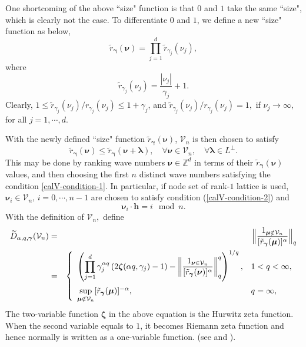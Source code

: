 \documentclass[article]{siamltex}
\def\bh{{\boldsymbol h}}
\def\bmu{{\boldsymbol \mu }}
\def\bnu{{\boldsymbol \nu }}
\def\blam{{\boldsymbol \lambda }}
\def\bgam{{\boldsymbol \gamma }}
\def\bzeta{{\boldsymbol \zeta }}
\def\calV {\mathcal {V}}
\newcommand{\df}[2]{\displaystyle\frac{#1}{#2}}
\newcommand{\crno}{\cr\noalign{\vskip2mm}}
\newcommand{\Z}{{\mathbb Z}}
\newcommand{\dprod}{\displaystyle\prod}
\begin{document}
One shortcoming of  the above ``size" function is that $0$ and $1$ take the same ``size", which is clearly not the case. To differentiate  $0$ and $1$, we define a new ``size" function as below,
\begin{equation}\label{rnew}\tilde{r}_\bgam(\bnu)=\dprod_{j=1}^d
\tilde{r}_{\gamma_j}(\nu_j),\end{equation}
 where \begin{equation}\tilde{r}_{\gamma_j}(\nu_j) =\frac{|\nu_j|}{\gamma_j}+1. \end{equation}
 Clearly, $1 \le \tilde{r}_{\gamma_j}(\nu_j)/ r_{\gamma_j}(\nu_j)\le 1+\gamma_j$, and $\tilde{r}_{\gamma_j}(\nu_j)/ r_{\gamma_j}(\nu_j)=1,$
if $\nu_j \rightarrow \infty,$ for all $j=1,\cdots,d.$


With the newly defined ``size" function $\tilde{r}_\bgam(\bnu)$,  ${\calV}_n$ is then chosen to satisfy
 \begin{equation}                      \label{calV-condition-2}
\tilde{r}_{\bgam}(\bnu)\leq \tilde{r}_{\bgam}(\bnu+\blam), \quad
 \forall\bnu\in{\calV}_n, \quad \forall\blam\in{L^\bot}.
 \end{equation}
 This may be done by ranking wave numbers $\bnu\in{\Z^d}$ in terms of
 their $\tilde{r}_{\bgam}(\bnu)$ values, and then choosing the first $n$ distinct wave numbers satisfying the condition
 \eqref{calV-condition-1}.
In particular, if node set of  rank-$1$
 lattice is used,  $\bnu_i \in \calV_n,\, i=0,\cdots,n-1$ are chosen to satisfy
 condition (\ref{calV-condition-2}) and
  \begin{equation}                      \label{calV-condition-3}
 \bnu_i \cdot \bh =i \mod n.
 \end{equation}
With the definition of $\calV_n,$ define
\begin{eqnarray}                            \label{tilde D}
 \widetilde{D}_{\alpha,q,\bgam}({\calV}_n)&=&\Big\|
  \df{1_{\bmu\notin{\calV}_n}}{[\tilde{r}_{\bgam}(\bmu)]^{\alpha}}\Big\|_q\nonumber\\&=&\left\{
  \begin{array}{ll}
    \left(\dprod_{j=1}^d\gamma_j^{\alpha q}\left(2\bzeta(\alpha q,\gamma_j )-1\right)-\left\|\df{1_{\bnu\in{\calV}_n}}{[\tilde{r}_{\bgam}(\bnu)]^{\alpha}}
    \right\|_q^q\right)^{1/q},
   & 1<q<\infty,
   \crno
   \sup\limits_{\bmu\notin{\calV}_n}[\tilde{r}_{\bgam}(\bmu)]^{-\alpha}, & q=\infty,
   \end{array} \right.
\end{eqnarray}
The two-variable function $\bzeta$ in the above equation is the Hurwitz zeta function. When the second variable equals to $1$, it becomes Riemann zeta function and hence normally is written as a one-variable function. (see \cite{Hickernell1998} and \cite{SloJoe92}).
\end{document}
